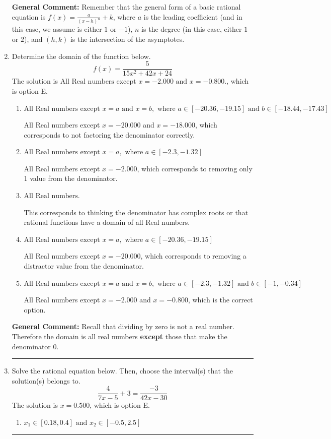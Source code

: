 \documentclass{extbook}[14pt]
\newcommand{\litem}[1]{\item #1

\rule{\textwidth}{0.4pt}}
\begin{document}
\begin{enumerate}
{\textbf{General Comment:} Remember that the general form of a basic rational equation is $ f(x) = \frac{a}{(x-h)^n} + k$, where $a$ is the leading coefficient (and in this case, we assume is either $1$ or $-1$), $n$ is the degree (in this case, either $1$ or $2$), and $(h, k)$ is the intersection of the asymptotes.
}
\litem{
Determine the domain of the function below.
\[ f(x) = \frac{5}{15x^{2} +42 x + 24} \]The solution is \( \text{All Real numbers except } x = -2.000 \text{ and } x = -0.800. \), which is option E.\begin{enumerate}[label=\Alph*.]
\item \( \text{All Real numbers except } x = a \text{ and } x = b, \text{ where } a \in [-20.36, -19.15] \text{ and } b \in [-18.44, -17.43] \)

All Real numbers except $x = -20.000$ and $x = -18.000$, which corresponds to not factoring the denominator correctly.
\item \( \text{All Real numbers except } x = a, \text{ where } a \in [-2.3, -1.32] \)

All Real numbers except $x = -2.000$, which corresponds to removing only 1 value from the denominator.
\item \( \text{All Real numbers.} \)

This corresponds to thinking the denominator has complex roots or that rational functions have a domain of all Real numbers.
\item \( \text{All Real numbers except } x = a, \text{ where } a \in [-20.36, -19.15] \)

All Real numbers except $x = -20.000$, which corresponds to removing a distractor value from the denominator.
\item \( \text{All Real numbers except } x = a \text{ and } x = b, \text{ where } a \in [-2.3, -1.32] \text{ and } b \in [-1, -0.34] \)

All Real numbers except $x = -2.000$ and $x = -0.800$, which is the correct option.
\end{enumerate}

\textbf{General Comment:} Recall that dividing by zero is not a real number. Therefore the domain is all real numbers \textbf{except} those that make the denominator 0.
}
\litem{
Solve the rational equation below. Then, choose the interval(s) that the solution(s) belongs to.
\[ \frac{4}{7x -5} + 3 = \frac{-3}{42x -30} \]The solution is \( x = 0.500 \), which is option E.\begin{enumerate}[label=\Alph*.]
\item \( x_1 \in [0.18, 0.4] \text{ and } x_2 \in [-0.5,2.5] \)


\end{enumerate}}
\end{enumerate}
\end{document}
